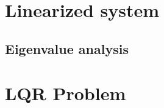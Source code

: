 \documentclass[letterpaper, 12 pt]{article}  %
\begin{document}
\section{Linearized system}


\subsection{Eigenvalue analysis}

\section{LQR Problem}


\end{document}
